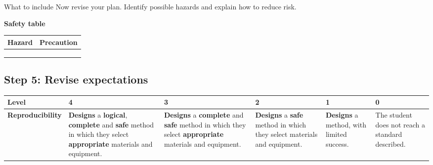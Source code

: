 \documentclass[12pt]{article}
\begin{document}
\begin{infobox}{What to include}
Now revise your plan. Identify possible hazards and explain how to reduce risk.
\end{infobox}

\textbf{Safety table}

\begin{center}
\begin{tabularx}{\textwidth}{|>{\raggedright\arraybackslash}X|>{\raggedright\arraybackslash}X|}
\hline
\textbf{Hazard} & \textbf{Precaution} \\ \hline
& \\[1.8em] \hline
& \\[1.8em] \hline
& \\[1.8em] \hline
\end{tabularx}
\end{center}

\vspace{1em}

\newpage

\subsection*{Step 5: Revise expectations}

\begin{center}
\begin{tabularx}{\textwidth}{|>{\raggedright\arraybackslash}X|
                               >{\raggedright\arraybackslash}X|
                               >{\raggedright\arraybackslash}X|
                               >{\raggedright\arraybackslash}X|
                               >{\raggedright\arraybackslash}X|
                               >{\raggedright\arraybackslash}X|}
\hline
\textbf{Level} & \textbf{4} & \textbf{3} & \textbf{2} & \textbf{1} & \textbf{0} \\ \hline
\textbf{Reproducibility}
& \textbf{Designs} a \textbf{logical}, \textbf{complete} and \textbf{safe} method in which they select \textbf{appropriate} materials and equipment.
& \textbf{Designs} a \textbf{complete} and \textbf{safe} method in which they select \textbf{appropriate} materials and equipment.
& \textbf{Designs} a \textbf{safe} method in which they select materials and equipment.
& \textbf{Designs} a method, with limited success.
& The student does not reach a standard described. \\ \hline
\end{tabularx}
\end{center}
\end{document}
